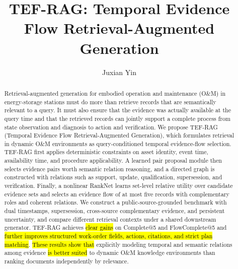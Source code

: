 \documentclass[letterpaper,10pt,conference]{IEEEtran}
\title{TEF-RAG: Temporal Evidence Flow Retrieval-Augmented Generation}
\author{Juxian Yin}
\newcommand{\AIHL}[1]{\hl{#1}} %
\begin{document}
\maketitle

\begin{abstract}
Retrieval-augmented generation for embodied operation and maintenance (O\&M) in energy-storage stations must do more than retrieve records that are semantically relevant to a query. It must also ensure that the evidence was actually available at the query time and that the retrieved records can jointly support a complete process from state observation and diagnosis to action and verification. We propose TEF-RAG (Temporal Evidence Flow Retrieval-Augmented Generation), which formulates retrieval in dynamic O\&M environments as query-conditioned temporal evidence-flow selection. TEF-RAG first applies deterministic constraints on asset identity, event time, availability time, and procedure applicability. A learned pair proposal module then selects evidence pairs worth semantic relation reasoning, and a directed graph is constructed with relations such as support, update, qualification, supersession, and verification. Finally, a nonlinear RankNet learns set-level relative utility over candidate evidence sets and selects an evidence flow of at most five records with complementary roles and coherent relations. We construct a public-source-grounded benchmark with dual timestamps, supersession, cross-source complementary evidence, and persistent uncertainty, and compare different retrieval contexts under a shared downstream generator. %
TEF-RAG achieves \AIHL{clear gains} on Complete@5 and FlowComplete@5 and \AIHL{further improves structured work-order fields, actions, citations, and strict plan matching}. %
\AIHL{These results show that} explicitly modeling temporal and semantic relations among evidence \AIHL{is better suited} to dynamic O\&M knowledge environments than ranking documents independently by relevance.
\end{abstract}







\newpage
\appendices

\end{document}
